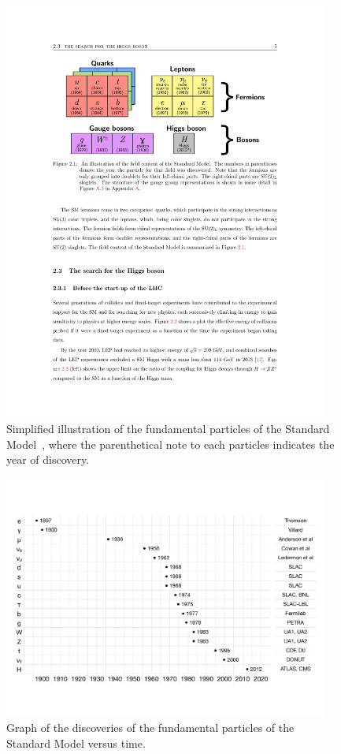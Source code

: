 \begin{figure}[tp]
  \centering
  \includegraphics[width=0.95\textwidth]{figures/standardmodel/particles_reece}
  \caption{Simplified illustration of the fundamental particles of the Standard Model~\cite{2013.thesis.ryan}, where the parenthetical note to each particles indicates the year of discovery.}
  \label{fig:sm-particles-1}
\end{figure}

\begin{figure}[tp]
  \centering
  \includegraphics[width=0.95\textwidth]{figures/standardmodel/discoveries}
  \caption{Graph of the discoveries of the fundamental particles of the Standard Model versus time.}
  \label{fig:sm-particles-2}
\end{figure}


